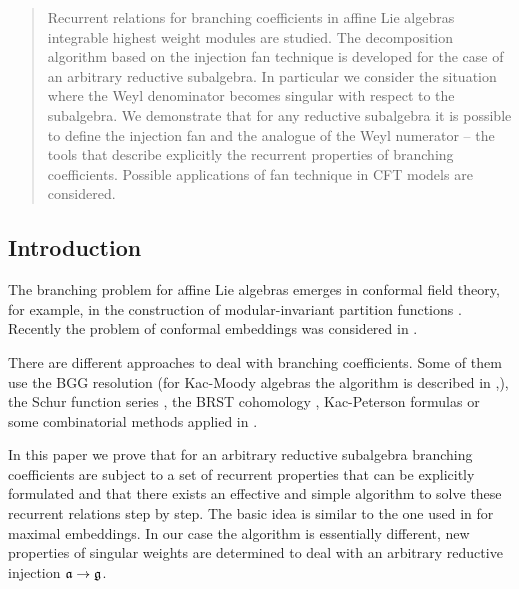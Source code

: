 \begin{abstract}
  Recurrent relations for branching coefficients in affine Lie algebras
  integrable highest weight modules are studied. The decomposition algorithm
  based on the injection fan technique is developed for the case of an arbitrary
  reductive subalgebra. In particular we consider the situation where
  the Weyl denominator becomes singular with respect to the subalgebra.
  We demonstrate
  that for any reductive subalgebra it is possible to define the
  injection fan and the analogue of the Weyl numerator -- the tools that describe
  explicitly the recurrent properties of branching coefficients.
  Possible applications of fan technique in CFT models are considered.
\end{abstract}

\subsection{Introduction}
\label{sec:introduction}

The branching problem for affine Lie algebras emerges in conformal field theory, for example,
in the construction of modular-invariant partition functions \cite{difrancesco1997cft}.
Recently the problem of conformal embeddings was considered in \cite{coquereaux2008conformal}.

There are different approaches to deal with branching coefficients. Some of them use the BGG
resolution \cite{bernstein1975differential} (for Kac-Moody algebras the algorithm is described in
\cite{kac1990idl},\cite{wakimoto2001idl}), the Schur function series \cite{fauser2006new}, the BRST
cohomology \cite{Hwang:1994yr}, Kac-Peterson formulas \cite{kac1990idl,quella2002branching} or some
combinatorial methods applied in \cite{feigin707principal}.

In this paper we prove that
for an arbitrary reductive subalgebra branching coefficients are subject to
a set of recurrent properties that can be explicitly formulated and that there exists
an effective and simple algorithm to solve these recurrent relations step by step.
The basic idea is similar to the one used in \cite{ilyin812pbc} for maximal embeddings.
In our case the algorithm is essentially different, new properties of singular weights
are determined to deal with an arbitrary reductive injection $\frak{a} \rightarrow \frak{g}$.

